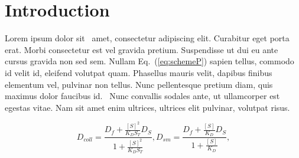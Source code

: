 \graphicspath{ {./content/intro/figures/} }

\section*{Introduction}
\label{sec:intro}  %

Lorem ipsum dolor sit~\cite{Xarticle} amet, consectetur adipiscing elit. Curabitur eget porta erat. Morbi consectetur est vel gravida pretium. Suspendisse ut dui eu ante cursus gravida non sed sem. Nullam Eq.~(\ref{eq:schemeP}) sapien tellus, commodo id velit id, eleifend volutpat quam. Phasellus mauris velit, dapibus finibus elementum vel, pulvinar non tellus. Nunc pellentesque pretium diam, quis maximus dolor faucibus id.~\cite{bertram} Nunc convallis sodales ante, ut ullamcorper est egestas vitae. Nam sit amet enim ultrices, ultrices elit pulvinar, volutpat risus.

\begin{equation}\label{eq:schemeP} 
D_{coll} = \frac{D_f+\frac{[S]^2}{K_D S_T} D_S} {1+\frac{[S]^2}{K_D S_T}}, 
D_{sm} = \frac{D_f+ \frac{[S]}{K_D} D_S}{1+\frac{[S]}{K_D}},
\end{equation}




